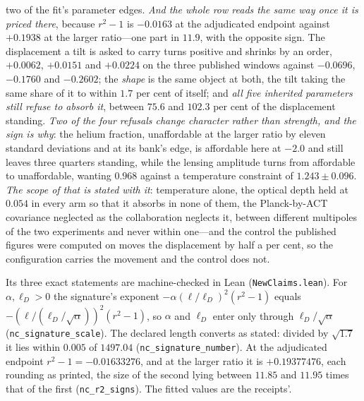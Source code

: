 \documentclass[11pt,a4paper]{article}
\theoremstyle{plain}
\theoremstyle{definition}
\theoremstyle{remark}
\begin{document}
two of the fit's parameter edges.
\emph{And the whole row reads the same way once it is priced there}, because $r^{2}-1$ is $-0.0163$ at the
adjudicated endpoint against $+0.1938$ at the larger ratio---one part in $11.9$, with the opposite sign.
The displacement a tilt is asked to carry turns positive and shrinks by an order, $+0.0062$, $+0.0151$ and
$+0.0224$ on the three published windows against $-0.0696$, $-0.1760$ and $-0.2602$; the \emph{shape} is the
same object at both, the tilt taking the same share of it to within $1.7$ per cent of itself; and
\emph{all five inherited parameters still refuse to absorb it}, between $75.6$ and $102.3$ per cent of the
displacement standing. \emph{Two of the four refusals change character rather than strength, and the sign is
why}: the helium fraction, unaffordable at the larger ratio by eleven standard deviations and at its bank's
edge, is affordable here at $-2.0$ and still leaves three quarters standing, while the lensing amplitude
turns from affordable to unaffordable, wanting $0.968$ against a temperature constraint of
$1.243\pm0.096$.
\emph{The scope of that is stated with it}: temperature alone, the optical depth held at $0.054$ in every
arm so that it absorbs in none of them, the Planck-by-ACT covariance neglected as the collaboration
neglects it, between different multipoles of the two experiments and never within one---and the control the
published figures were computed on moves the displacement by half a per cent, so the configuration carries
the movement and the control does not.

Its three exact statements are machine-checked in Lean (\texttt{NewClaims.lean}). For $\alpha,\ell_{D}>0$ the signature's exponent $-\alpha(\ell/\ell_{D})^{2}(r^{2}-1)$ equals $-(\ell/(\ell_{D}/\sqrt\alpha))^{2}(r^{2}-1)$, so $\alpha$ and $\ell_{D}$ enter only through $\ell_{D}/\sqrt\alpha$ (\texttt{nc\_signature\_scale}). The declared length converts as stated: divided by $\sqrt{1.7}$ it lies within $0.005$ of $1497.04$ (\texttt{nc\_signature\_number}). At the adjudicated endpoint $r^{2}-1=-0.01633276$, and at the larger ratio it is $+0.19377476$, each rounding as printed, the size of the second lying between $11.85$ and $11.95$ times that of the first (\texttt{nc\_r2\_signs}). The fitted values are the receipts'.
\end{document}
